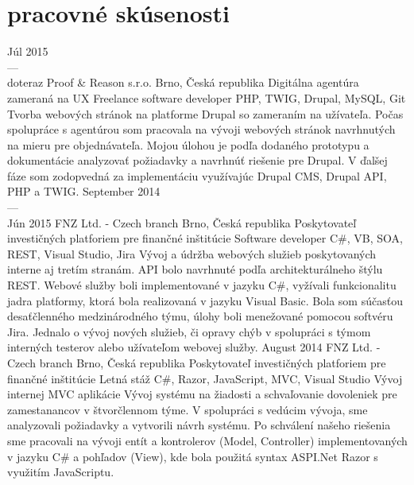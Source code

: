 \documentclass[]{friggeri-cv} %
\begin{document}
\section{pracovné skúsenosti}

\begin{entrylist}
  \job
  {Júl 2015 \\ --- \\ doteraz}
  {Proof \& Reason s.r.o.}
  {Brno, Česká republika}
  {Digitálna agentúra zameraná na UX}
  {
    \position
    {Freelance software developer}
    {PHP, TWIG, Drupal, MySQL, Git}
    {Tvorba webových stránok na platforme Drupal so zameraním na užívateľa. Počas spolupráce s agentúrou som pracovala na vývoji webových stránok navrhnutých na mieru pre objednávateľa. Mojou úlohou je podľa dodaného prototypu a dokumentácie analyzovať požiadavky a navrhnúť riešenie pre Drupal. V ďalšej fáze som zodopvedná za implementáciu využívajúc Drupal CMS, Drupal API, PHP a TWIG.}
  }
\job
{September 2014 \\ --- \\ Jún 2015}
{FNZ Ltd. - Czech branch}
{Brno, Česká republika}
{Poskytovateľ investičných platforiem pre finančné inštitúcie}
{
  \position
  {Software developer}
  {C\#, VB, SOA, REST, Visual Studio, Jira}
  {Vývoj a údržba webových služieb poskytovaných interne aj tretím stranám. API bolo navrhnuté podľa architekturálneho štýlu REST. Webové služby boli implementované v jazyku C#, vyžívali funkcionalitu jadra platformy, ktorá bola realizovaná v jazyku Visual Basic. Bola som súčasťou desaťčlenného medzinárodného týmu, úlohy boli menežované pomocou softvéru Jira. Jednalo o vývoj nových služieb, či opravy chýb v spolupráci s týmom interných testerov alebo užívateľom webovej služby.}
}
\job
{August 2014}
{FNZ Ltd. - Czech branch}
{Brno, Česká republika}
{Poskytovateľ investičných platforiem pre finančné inštitúcie}
{
  \position
  {Letná stáž}
  {C\#, Razor, JavaScript, MVC, Visual Studio}
  {Vývoj internej MVC aplikácie
  Vývoj systému na žiadosti a schvaľovanie dovoleniek pre zamestanancov v štvorčlennom týme. V spolupráci s vedúcim vývoja, sme analyzovali požiadavky a vytvorili návrh systému. Po schválení našeho riešenia sme pracovali na vývoji entít a kontrolerov (Model, Controller) implementovaných v jazyku C# a pohľadov (View), kde bola použitá syntax ASPI.Net Razor s využitím JavaScriptu.}
}

\end{entrylist}
\end{document}
